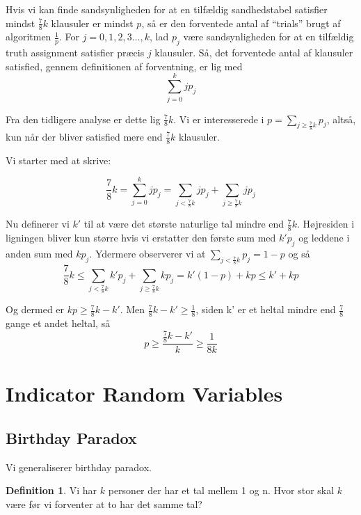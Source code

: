 \documentclass[11pt]{article}
\theoremstyle{definition}
\newtheorem{definition}{Definition}
\theoremstyle{remark}
\begin{document}
Hvis vi kan finde sandsynligheden for at en tilfældig sandhedstabel satisfier mindst $\frac{7}{8}k$ klausuler er mindst $p$, så er den forventede antal af ``trials'' brugt af algoritmen $\frac{1}{p}$.
For $j = 0, 1, 2, 3\ldots, k$, lad $p_{j}$ være sandsynligheden for at en tilfældig truth assignment satisfier præcis $j$ klausuler. Så, det forventede antal af klausuler satisfied, gennem definitionen af forventning, er lig med \[
\sum_{j=0}^{k}j p_{j}
\]

Fra den tidligere analyse er dette lig $\frac{7}{8}k$.
Vi er interesserede i $p = \sum_{j \geq \frac{7}{8}k}^{}p_{j}$, altså, kun når der bliver satisfied mere end $\frac{7}{8}k$ klausuler.

Vi starter med at skrive:

\[
\frac{7}{8}k = \sum_{j=0}^{k}jp_{j} = \sum_{j < \frac{7}{8}k}^{} jp_{j} + \sum_{j \geq \frac{7}{8}k}^{} j p_{j}
\]

Nu definerer vi $k'$ til at være det største naturlige tal mindre end $\frac{7}{8}k$. Højresiden i ligningen bliver kun større hvis vi erstatter den første sum med $k'p_{j}$ og leddene i anden sum med $kp_{j}$. Ydermere observerer vi at $\sum_{j < \frac{7}{8}k}^{}p_{j} = 1 - p$ og så
\[
\frac{7}{8}k \leq \sum_{j < \frac{7}{8}k}^{} k'p_{j} + \sum_{j \geq \frac{7}{8}k}^{}kp_{j} = k'(1-p)+kp \leq k' + kp
\]

Og dermed er $kp \geq \frac{7}{8}k - k'$. Men $\frac{7}{8}k - k' \geq \frac{1}{8}$, siden k' er et heltal mindre end $\frac{7}{8}$ gange et andet heltal, så
\[
p \geq \frac{\frac{7}{8}k - k'}{k} \geq \frac{1}{8k}
\]


\label{subsec:label}



\newpage

\section{Indicator Random Variables}
\label{sec:indicator}


\subsection{Birthday Paradox}
\label{subsec:label}

Vi generaliserer birthday paradox.
\begin{definition}
Vi har $k$ personer der har et tal mellem 1 og n. Hvor stor skal $k$ være før vi forventer at to har det samme tal?
\end{definition}
\end{document}
